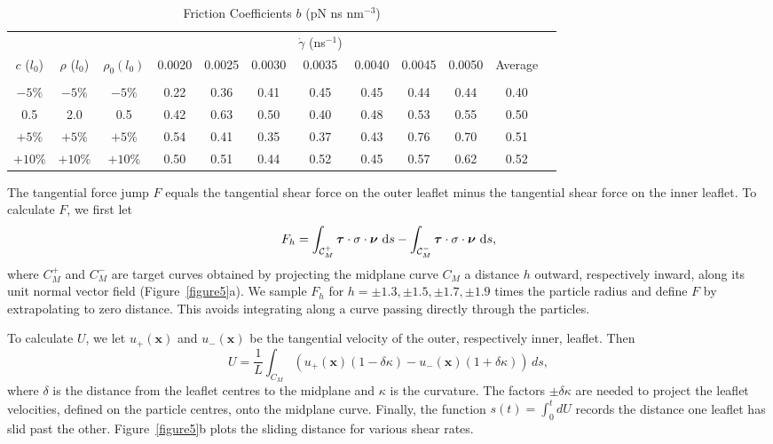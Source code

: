 \documentclass[lineno]{jfm}
\newcommand{\nnu}{\boldsymbol{\nu}}
\newcommand{\ttau}{\boldsymbol{\tau}}
\begin{document}
\begin{table}
\caption{Friction Coefficients $b$ (pN ns nm$^{-3}$) \\
}
\centering
\begin{tabular}{c c c c c c c c c c c c }
  \hline
& & & & & & $\dot\gamma$  (ns$^{-1}$)& & & & &
  \\
  $c$ ($l_0$) &  $\rho$ ($l_0$) & $\rho_0(l_0)$ & 0.0020   &  0.0025 &  0.0030 &  0.0035 &  0.0040 & 0.0045 & 0.0050  & Average\\
\cline{4-10}\\
$-5 \%$ & $- 5 \%$ & $-5 \%$  & 0.22 & 0.36 & 0.41   & 0.45  & 0.45 & 0.44   & 0.44 & 0.40\\
0.5 &  2.0 & 0.5    & 0.42 & 0.63 & 0.50   & 0.40  & 0.48  & 0.53 & 0.55 & 0.50 \\   %
$+5 \%$ & $+ 5 \%$ & $+ 5 \%$  & 0.54 & 0.41 & 0.35  & 0.37 & 0.43 & 0.76  & 0.70 & 0.51\\ 
$+ 10 \%$ & $+ 10 \%$ & $+ 10 \%$    & 0.50  & 0.51  &  0.44 & 0.52  & 0.45 &  0.57   &  0.62 & 0.52  
\end{tabular} 
\label{table1}
\end{table}


The tangential force jump $F$ equals the 
tangential shear force on the outer
leaflet minus the tangential shear force on the inner leaflet. 
To calculate  $F$, we first let 
\begin{align}
F_h = \int_{\mathcal{C}_M^+} 
  \ttau \cdot \sigma \cdot \nnu \,\dif s - \int_{\mathcal{C}_M^-} 
 \ttau \cdot \sigma \cdot \nnu \,\dif s,
\end{align}
where $C_M^+$ and $C_M^-$ are target curves obtained by projecting the
midplane curve $C_M$  a distance $h$ outward,
respectively inward, along its unit normal vector field (Figure~\ref{figure5}a). We sample $F_h$ for 
$h = \pm 1.3, \pm 1.5,  \pm 1.7, \pm 1.9$ times the particle radius and define $F$ by
extrapolating to zero distance. This avoids integrating along a curve passing directly through the
particles.   

To calculate $U$, we let $u_+(\mathbf{x})$ and $u_-(\mathbf{x})$ 
be the tangential velocity of the outer, respectively inner, leaflet.  Then 
\begin{equation}
  U = \frac{1}{L}\int_{C_M}\left(u_+(\mathbf{x})(1 - \delta \kappa) -
  u_-(\mathbf{x})(1 +  \delta \kappa)\right) \, ds,
\end{equation}
where $ \delta $ is the distance from the leaflet centres to the midplane and $\kappa$ is the curvature. 
The factors $\pm  \delta \kappa$ are needed to project the leaflet velocities, defined on the particle centres,
onto the midplane curve. 
Finally, the function $s(t) = \int_0^t dU $ records the distance one leaflet has
slid past the other. Figure~\ref{figure5}b plots the sliding distance for various shear
rates. 
\end{document}
